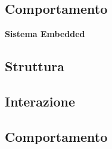\subsection{Comportamento}

\begin{center}
  \textbf{Sistema Embedded}
\end{center}

\subsection{Struttura}
\subsection{Interazione}
\subsection{Comportamento}
